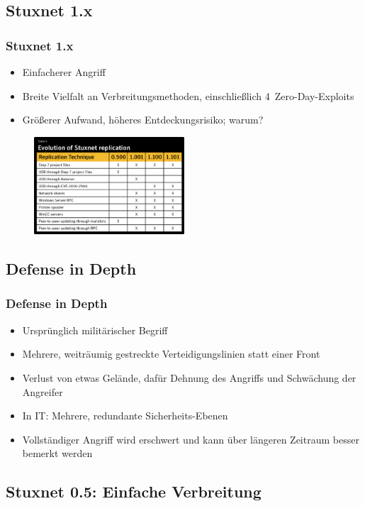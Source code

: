 \documentclass{beamer}
\begin{document}
\subsection{Stuxnet 1.x}

\begin{frame}
  \frametitle{Stuxnet 1.x}
  \begin{itemize}
    \item Einfacherer Angriff
    \item Breite Vielfalt an Verbreitungsmethoden, einschließlich 4~Zero-Day-Exploits
    \item Größerer Aufwand, höheres Entdeckungsrisiko; warum?
  \end{itemize}
  \begin{figure}[p]
    \centering
    \includegraphics[width=0.5\textwidth]{../Evolution_replication.png}
  \end{figure}
\end{frame}

\subsection{Defense in Depth}

\begin{frame}
  \frametitle{Defense in Depth}
  \begin{itemize}
    \item Ursprünglich militärischer Begriff
    \item Mehrere, weiträumig gestreckte Verteidigungslinien statt einer Front
    \item Verlust von etwas Gelände, dafür Dehnung des Angriffs und Schwächung der Angreifer
    \item In IT: Mehrere, redundante Sicherheits-Ebenen
    \item Vollständiger Angriff wird erschwert und kann über längeren Zeitraum besser bemerkt werden
  \end{itemize}
\end{frame}

\subsection{Stuxnet 0.5: Einfache Verbreitung}
\end{document}
